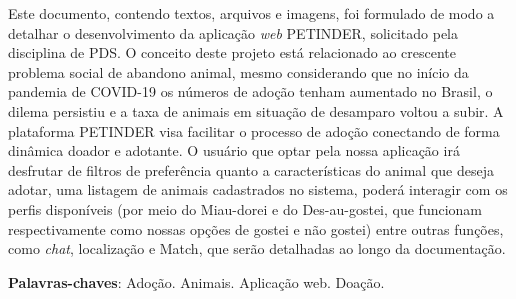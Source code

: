 
\setlength{\absparsep}{18pt} %
\begin{resumo}
\label{resumo}
Este documento, contendo textos, arquivos e imagens, foi formulado de modo a detalhar o desenvolvimento da aplicação \textit{web} PETINDER, solicitado pela disciplina de \ac{PDS}. O conceito deste projeto está relacionado ao crescente problema social de abandono animal, mesmo considerando que no início da pandemia de \gls{COVID-19} os números de adoção tenham aumentado no Brasil, o dilema
persistiu e a taxa de animais em situação de desamparo voltou a subir. A plataforma PETINDER visa facilitar o processo de adoção conectando de forma dinâmica doador e adotante. O usuário que optar pela nossa aplicação irá desfrutar de filtros de preferência quanto a características do animal que deseja adotar, uma listagem de animais cadastrados no sistema, poderá interagir com os perfis disponíveis (por meio do \gls{Miau-dorei} e do \gls{Des-au-gostei}, que funcionam respectivamente como nossas opções de gostei e não gostei) entre outras funções, como \textit{chat}, localização e \gls{Match}, que serão detalhadas ao longo da documentação.

 \textbf{Palavras-chaves}: Adoção. Animais. Aplicação web. Doação.
\end{resumo}

